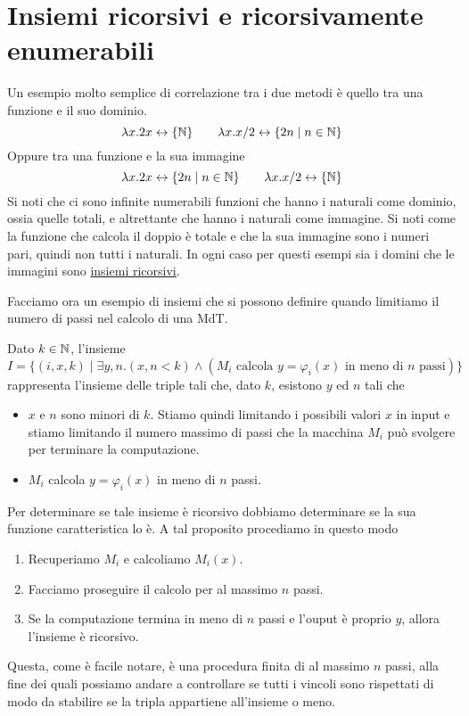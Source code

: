 \section{Insiemi ricorsivi e ricorsivamente enumerabili}
Un esempio molto semplice di correlazione tra i due metodi è
quello tra una funzione e il suo dominio.
\[
	\lambda x . 2 x \leftrightarrow \{ \mathbb{N} \} \qquad
	\lambda x . x / 2 \leftrightarrow \{ 2n \mid n \in \mathbb{N} \}
\]
Oppure tra una funzione e la sua immagine
\[
	\lambda x . 2 x \leftrightarrow \{ 2 n \mid n \in \mathbb{N} \}
	\qquad \lambda x . x / 2 \leftrightarrow \{ \mathbb{N} \}
\]
Si noti che ci sono infinite numerabili funzioni che hanno i
naturali come dominio, ossia quelle totali, e altrettante che
hanno i naturali come immagine. Si noti come la funzione che
calcola il doppio è totale e che la sua immagine sono i numeri
pari, quindi non tutti i naturali. In ogni caso per questi
esempi sia i domini che le immagini sono
\hyperref[def: relazione ricorsiva]{insiemi ricorsivi}.

Facciamo ora un esempio di insiemi che si possono definire
quando limitiamo il numero di passi nel calcolo di una MdT.

\begin{example}
	Dato $k \in \mathbb{N}$, l'insieme
	\[
		I = \{ (i, x, k) \mid \exists y, n . (x, n < k)
		\land (M_i \text{ calcola } y = \varphi_i (x)
		\text{ in meno di } n \text{ passi}) \}
	\]
	rappresenta l'insieme delle triple tali che, dato $k$,
	esistono $y$ ed $n$ tali che
	\begin{itemize}
		\item $x$ e $n$ sono minori di $k$. Stiamo quindi
		      limitando i possibili valori $x$ in input e stiamo
		      limitando il numero massimo di passi che la
		      macchina $M_i$ può svolgere per terminare la
		      computazione.
		\item $M_i$ calcola $y = \varphi_i (x)$ in meno di $n$
		      passi.
	\end{itemize}
	Per determinare se tale insieme è ricorsivo dobbiamo
	determinare se la sua funzione caratteristica lo è. A tal
	proposito procediamo in questo modo
	\begin{enumerate}
		\item Recuperiamo $M_i$ e calcoliamo $M_i(x)$.
		\item Facciamo proseguire il calcolo per al massimo $n$
		      passi.
		\item Se la computazione termina in meno di $n$ passi
		      e l'ouput è proprio $y$, allora l'insieme è
		      ricorsivo.
	\end{enumerate}
	Questa, come è facile notare, è una procedura finita di al
	massimo $n$ passi, alla fine dei quali possiamo andare a
	controllare se tutti i vincoli sono rispettati di modo da
	stabilire se la tripla appartiene all'insieme o meno.
\end{example}

